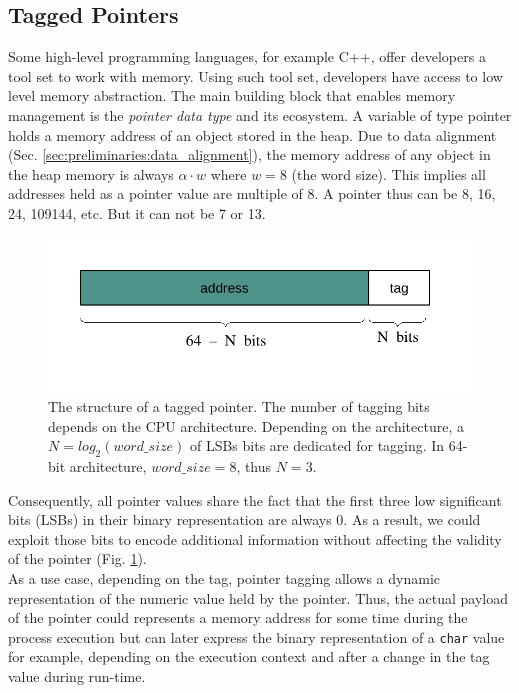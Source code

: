 \subsection{Tagged Pointers}
Some high-level programming languages, for example C++, offer developers a tool set to work with memory. Using such tool set, developers have access to low level memory abstraction. The main building block that enables memory management is the \textit{pointer data type} and its ecosystem. A variable of type pointer holds a memory address of an object stored in the heap. Due to data alignment (Sec. \ref{sec:preliminaries:data_alignment}), the memory address of any object in the heap memory is always $\alpha\cdot w$ where $w=8$ (the word size). This implies all addresses held as a pointer value are multiple of 8. A pointer thus can be 8, 16, 24, 109144, etc. But it can not be 7 or 13. \\

\begin{figure}
	\centering
	\includegraphics[scale=1]{figures/chapter2/pointervalue}
	\caption{The structure of a tagged pointer. The number of tagging bits depends on the CPU architecture. Depending on the architecture, a $ N = log_{2}(word\_size)$ of LSBs bits are dedicated for tagging. In 64-bit architecture, $word\_size = 8$, thus $N = 3$.}
	\label{fig:tagged_pointer}
\end{figure}


Consequently, all pointer values share the fact that the first three low significant bits (LSBs) in their binary representation are always 0. As a result, we could exploit those bits to encode additional information without affecting the validity of the pointer (Fig. \ref{fig:tagged_pointer}).  \\ 

As a use case, depending on the tag, pointer tagging allows a dynamic representation of the numeric value held by the pointer. Thus, the actual payload of the pointer could represents a memory address for some time during the process execution but can later express the binary representation of a \texttt{char} value for example, depending on the execution context and after a change in the tag value during run-time. \\


